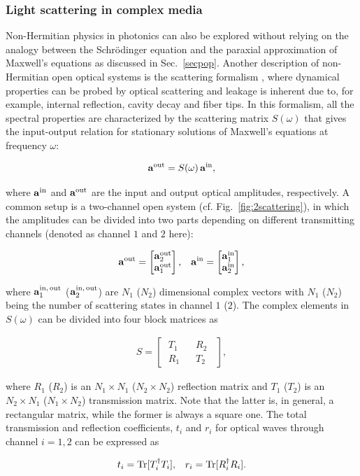 \documentclass{tADP2e}
\theoremstyle{plain}
\newcommand{\eqn}[1]{
\begin{eqnarray}
	#1
\end{eqnarray}
}
\theoremstyle{plain}
\theoremstyle{definition}
\begin{document}
\subsubsection{Light scattering in complex media\label{secplight}}
Non-Hermitian physics in photonics can also be explored without relying on the analogy between the Schr{\"o}dinger equation and the paraxial approximation of Maxwell's equations as discussed in Sec.~\ref{secpop}. Another description of non-Hermitian open optical systems is the scattering formalism \cite{SP01,BCWJ97}, where dynamical properties can be probed by optical scattering and leakage is inherent due to, for example, internal reflection, cavity decay and fiber tips. In this formalism, all the spectral properties are characterized by the scattering matrix $S(\omega)$ that gives the input-output relation for stationary solutions of Maxwell's equations at frequency $\omega$:
\eqn{
{\bf a}^{\rm out}=S(\omega)\,{\bf a}^{\rm in},
}
where ${\bf a}^{\rm in}$ and ${\bf a}^{\rm out}$ are the input and output optical amplitudes, respectively. A common setup is a two-channel open system (cf. Fig.~\ref{fig:2scattering}), in which the amplitudes can be divided into two parts depending on different transmitting channels (denoted as channel $1$ and $2$ here):
\eqn{
{\bf a}^{\rm out}=\begin{bmatrix}{\bf a}^{\rm out}_{2}\\
{\bf a}^{\rm out}_{1}
\end{bmatrix},
\;\;\;
{\bf a}^{\rm in}=\begin{bmatrix}{\bf a}^{\rm in}_{1}\\
{\bf a}^{\rm in}_{2}
\end{bmatrix},
}
where ${\bf a}_{1}^{\rm in,\,out}$ (${\bf a}_{2}^{\rm in,\,out}$) are $N_1$ ($N_2$) dimensional complex vectors with $N_1$ ($N_2$) being the number of scattering states in channel $1$ ($2$). The complex elements in $S(\omega)$ can be divided into four block matrices as
\eqn{\label{scamat}
S=\begin{bmatrix}
\;T_{1}\;&\;\;R_{2}\;\;\\
\;R_{1}\;&\;\;T_{2}\;\;
\end{bmatrix},
}
where $R_{1}$ ($R_2$) is an $N_1\times N_1$ ($N_2\times N_2$) reflection matrix and  $T_{1}$ ($T_2$) is an $N_2\times N_1$ ($N_1\times N_2$) transmission matrix.  
Note that the latter is, in general, a rectangular matrix, while the former is always a square one. The total transmission and reflection coefficients, $t_i$ and $r_i$ for optical waves through channel $i=1,2$ can be expressed as
\eqn{
t_{i}={\rm Tr}[T_i^\dagger T_i],\;\;\; r_{i}={\rm Tr}[R_i^\dagger R_i].
} 
\end{document}
